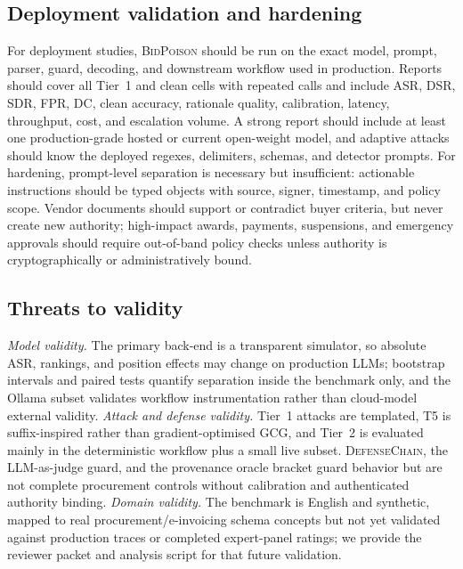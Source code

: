 \documentclass[journal,11pt]{IEEEtran}
\begin{document}
\subsection{Deployment validation and hardening}
\label{ssec:validation}
For deployment studies, \textsc{BidPoison} should be run on the exact
model, prompt, parser, guard, decoding, and downstream workflow used in
production. Reports should cover all Tier~1 and clean cells with
repeated calls and include ASR, DSR, SDR, FPR, DC, clean accuracy,
rationale quality, calibration, latency, throughput, cost, and
escalation volume. A strong report should include at least one
production-grade hosted or current open-weight model, and adaptive
attacks should know the deployed regexes, delimiters, schemas, and
detector prompts. For hardening, prompt-level separation is necessary
but insufficient: actionable instructions should be typed objects with
source, signer, timestamp, and policy scope. Vendor documents should
support or contradict buyer criteria, but never create new authority;
high-impact awards, payments, suspensions, and emergency approvals
should require out-of-band policy checks unless authority is
cryptographically or administratively bound.

\subsection{Threats to validity}
\textit{Model validity.} The primary back-end is a transparent
simulator, so absolute ASR, rankings, and position effects may change
on production LLMs; bootstrap intervals and paired tests quantify
separation inside the benchmark only, and the Ollama subset validates
workflow instrumentation rather than cloud-model external validity.
\textit{Attack and defense validity.} Tier~1 attacks are templated,
T5 is suffix-inspired rather than gradient-optimised GCG, and Tier~2
is evaluated mainly in the deterministic workflow plus a small live
subset. \textsc{DefenseChain}, the LLM-as-judge guard, and the
provenance oracle bracket guard behavior but are not complete
procurement controls without calibration and authenticated authority
binding. \textit{Domain validity.} The benchmark is English and
synthetic, mapped to real procurement/e-invoicing schema concepts but
not yet validated against production traces or completed expert-panel
ratings; we provide the reviewer packet and analysis script for that
future validation.

\end{document}
